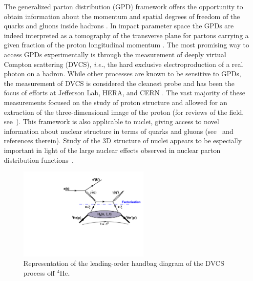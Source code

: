 \documentclass[twocolumn,nofootinbib,showpacs,prl,superscriptaddress,secnumarabic,amssymb,nobibnotes,aps,floatfix]{revtex4}
\begin{document}
The generalized parton distribution (GPD) framework offers the opportunity to 
obtain information about the momentum and spatial degrees of freedom of the 
quarks and gluons inside hadrons 
\cite{Mueller:1998fv,Ji:1996ek,Ji:1996nm,Radyushkin:1996nd,Radyushkin:1997ki}.
In impact parameter space the GPDs are indeed interpreted as a tomography of 
the transverse plane for partons carrying a given fraction of the proton 
longitudinal momentum 
\cite{Burkardt:2000za,Diehl:2002he,Belitsky:2002ep,Burkardt:2005hp}. 
The most promising way to access GPDs experimentally is through the measurement 
of deeply virtual Compton scattering (DVCS), \textit{i.e.}, the hard exclusive 
electroproduction of a real photon on a hadron. While other processes are known to be 
sensitive to GPDs, the measurement of DVCS is considered the cleanest probe and 
has been the focus of efforts at Jefferson Lab, HERA, and CERN
\cite{Stepanyan:2001sm,Airapetian,Chekanov:2003ya,Aktas:2005ty,Chen:2006na,Munoz 
Camacho:2006hx,Girod:2007aa,Mazouz:2007aa,Gavalian:2009,Seder:2015,Pisano:2015,
Jo:2015ema,Joerg:2016hhs}.  
The vast majority of these measurements focused on the study of proton 
structure and allowed for an extraction of the three-dimensional image of the 
proton (for reviews of the field, see~\cite{Goeke:2001tz,Diehl:2003ny,
Ji:2004gf,Belitsky:2005qn,Boffi:2007yc,Guidal:2013rya}).
This framework is also applicable to nuclei, giving access to novel 
information about nuclear structure in terms of quarks and 
gluons (see~\cite{Dupre:2015jha} and references therein).
Study of the 3D structure of nuclei appears to be especially important
in light of the large nuclear effects observed in nuclear parton distribution 
functions~\cite{Geesaman:1995yd,Norton:2003cb,Hen:2016kwk}.

\begin{figure}[tb]
\includegraphics[width=6.5cm]{figs/DVCS_diagram.pdf}
\caption{Representation of the leading-order handbag diagram of the DVCS 
process off $^4$He.}
\label{fig:diags}
\end{figure}
\end{document}
